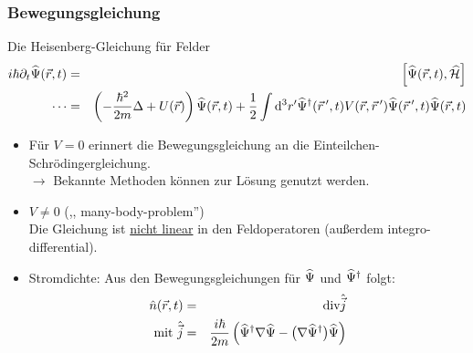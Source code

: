 \subsubsection{Bewegungsgleichung}
Die Heisenberg-Gleichung für Felder
\begin{eqnarray*}
i\hbar \partial_t \widehat\Psi(\vec r, t) &=& \left[ \widehat\Psi(\vec r, t), \widehat {\mathcal H}\right]
\\
\cdots &=& \left ( - \frac {\hbar^2}{2 m} \Delta + U(\vec r)\right) \widehat\Psi (\vec r, t) + \frac 1 2 \int \mathrm{d}^3r' \widehat\Psi^\dagger (\vec r\,{'}, t) V(\vec r, \vec r\,{'}) \widehat\Psi(\vec r\,{'}, t)\widehat\Psi(\vec r, t)
\end{eqnarray*}
\begin{itemize}
\item Für $V=0$ erinnert die Bewegungsgleichung an die Einteilchen- Schrödingergleichung.\\
$\longrightarrow$ Bekannte Methoden können zur Lösung genutzt werden.
\item $V\neq 0$ (,, many-body-problem'')\\
Die Gleichung ist \underline{nicht linear} in den Feldoperatoren (außerdem integro-differential).
\item Stromdichte: Aus den Bewegungsgleichungen für $\widehat\Psi$ und $\widehat\Psi^\dagger$ folgt:
\begin{eqnarray*}
\hat n (\vec r, t) &=& \text{div}  \hat{\vec  j}\\
\text{mit }\hat{\vec j} &=& \frac {i \hbar}{2 m} \left( \widehat\Psi^\dagger \nabla \widehat\Psi - \big(\nabla \widehat\Psi^\dagger\big) \widehat\Psi\right)
\end{eqnarray*}
\end{itemize}

